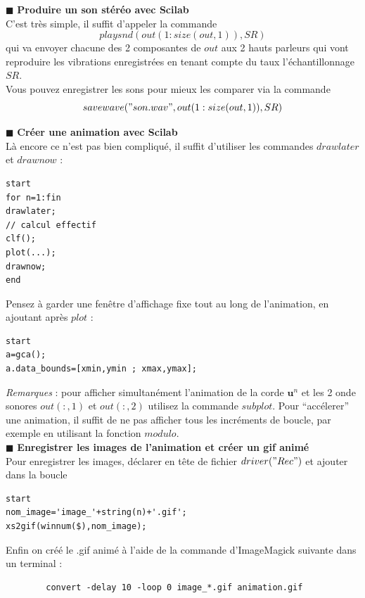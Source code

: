 \documentclass[a4,12pt]{article}
\newcommand{\ub}{\mathbf{u}}
\begin{document}
\hspace{0.5cm} $\blacksquare$ \textbf{Produire un son stéréo avec Scilab}\\

C'est très simple, il suffit d'appeler la commande 
\[
playsnd(out(1:size(out,1)),SR)
\]
qui va envoyer chacune des 2 composantes de $out$ aux 2 hauts parleurs qui vont reproduire les vibrations enregistrées en tenant compte du taux l'échantillonnage $SR$.\\

Vous pouvez enregistrer les sons pour mieux les comparer via la commande 
\[
savewave("son.wav",out(1:size(out,1)),SR)
\]

\hspace{0.5cm} $\blacksquare$ \textbf{Créer une animation avec Scilab}\\

Là encore ce n'est pas bien compliqué, il suffit d'utiliser les commandes $drawlater$ et $drawnow$ :

\begin{lstlisting}[frame=single,caption=Création d'une animation dans une boucle]  
start
for n=1:fin
drawlater;
// calcul effectif
clf();
plot(...);
drawnow;
end
\end{lstlisting}

Pensez à garder une fenêtre d'affichage fixe tout au long de l'animation, en ajoutant après $plot$ : 

\begin{lstlisting}[frame=single,caption=Fixer les dimensions du repère courant]  
start
a=gca();
a.data_bounds=[xmin,ymin ; xmax,ymax];
\end{lstlisting}

\textit{Remarques} : pour afficher simultanément l'animation de la corde $\ub^n$ et les 2 onde sonores $out(:,1)$ et $out(:,2)$ utilisez la commande $subplot$. Pour \enquote{accélerer} une animation, il suffit de ne pas afficher tous les incréments de boucle, par exemple en utilisant la fonction $modulo$.\\

\hspace{0.5cm} $\blacksquare$ \textbf{Enregistrer les images de l'animation et créer un gif animé}\\

Pour enregistrer les images, déclarer en tête de fichier $driver("Rec")$ et ajouter dans la boucle

\begin{lstlisting}[frame=single,caption=Enregistrer des images sous Scilab]  
start
nom_image='image_'+string(n)+'.gif'; 
xs2gif(winnum($),nom_image);
\end{lstlisting}

Enfin on créé le .gif animé à l'aide de la commande d'ImageMagick suivante dans un terminal : 
\begin{center}
	\begin{verbatim}
		convert -delay 10 -loop 0 image_*.gif animation.gif
	\end{verbatim}
\end{center}
 
\end{document}
